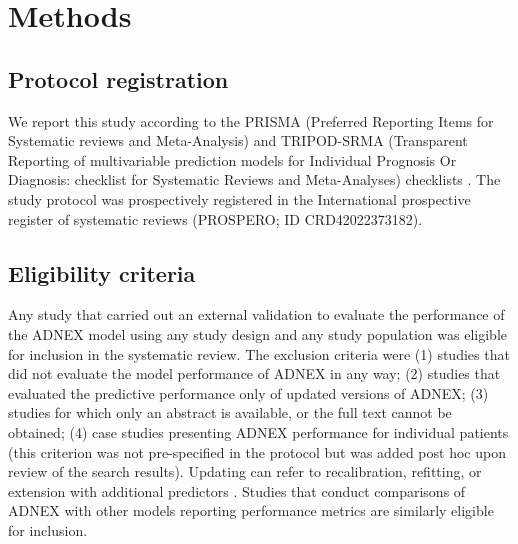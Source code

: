 \section{Methods}

\subsection{Protocol registration}
We report this study according to the \gls{PRISMA} (Preferred Reporting Items for
Systematic reviews and Meta-Analysis) and \gls{TRIPOD}-SRMA (Transparent Reporting of
multivariable prediction models for Individual Prognosis Or Diagnosis: checklist
for Systematic Reviews and Meta-Analyses) checklists
 \cite{snellTransparentReportingMultivariable2023,
pagePRISMA2020Statement2021}.
The study protocol was prospectively registered in the International prospective
register of systematic reviews (PROSPERO; ID CRD42022373182).

\subsection{Eligibility criteria}
Any study that carried out an external validation to evaluate the performance of
the \gls{ADNEX} model using any study design and any study population was eligible for
inclusion in the systematic review. The exclusion criteria were (1) studies that
did not evaluate the model performance of \gls{ADNEX} in any way; (2) studies that
evaluated the predictive performance only of updated versions of \gls{ADNEX}; (3)
studies for which only an abstract is available, or the full text cannot be
obtained; (4) case studies presenting \gls{ADNEX} performance for individual patients
(this criterion was not pre-specified in the protocol but was added post hoc
upon review of the search results). Updating can refer to recalibration,
refitting, or extension with additional predictors
 \cite{steyerbergClinicalPredictionModels2009}. Studies that conduct comparisons
of \gls{ADNEX} with other models reporting performance metrics are similarly eligible
for inclusion.

